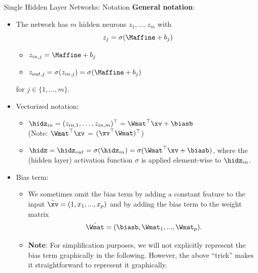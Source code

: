 \begin{vbframe}{Single Hidden Layer Networks: Notation}
  \textbf{General notation}:
  \begin{itemize}
    \vspace{4mm}
    \item The network has $m$ hidden neurons $z_1, \dots, z_m$ with
    $$ z_j = \sigma(\Maffine + b_j)$$
    \vspace{-0.5cm}
    \begin{itemize}
    \item $z_{in,j}  = \Maffine + b_j$
    \vspace{2mm}
    \item $z_{out,j} = \sigma(z_{in,j}) = \sigma(\Maffine + b_j)$
    \end{itemize}
    \vspace{4mm}
    for $j \in \{1,\ldots,m\}$.
    \vspace{4mm}
    \framebreak 

\item Vectorized notation:
\begin{itemize}
\item $ \hidz_{in} = (z_{in,1}, \dots, z_{in,m})^\top = \Wmat^\top \xv + \biasb$ \\ (Note: $\Wmat^\top \xv$ = $(\xv^\top \Wmat)^\top$)
\item $ \hidz = \hidz_{out} = \sigma(\hidz_{in}) = \sigma(\Wmat^\top \xv + \biasb)$, where the (hidden layer) activation function $\sigma$ is applied element-wise to $\hidz_{in}$.  
\end{itemize}
\item Bias term:         
\begin{itemize}
\item We sometimes omit the bias term by adding a constant feature to the input $\tilde{\xv} = (1, x_1, ..., x_p)$ and by adding the bias term to the weight matrix 
$$\tilde{\Wmat} = (\biasb, \Wmat_1, ..., \Wmat_p).$$ 
\item \textbf{Note}: For simplification purposes, we will not explicitly represent the bias term graphically in the following. However, the above \enquote{trick} makes it straightforward to represent it graphically. 
\end{itemize}
\end{itemize}
\framebreak


\end{vbframe}
